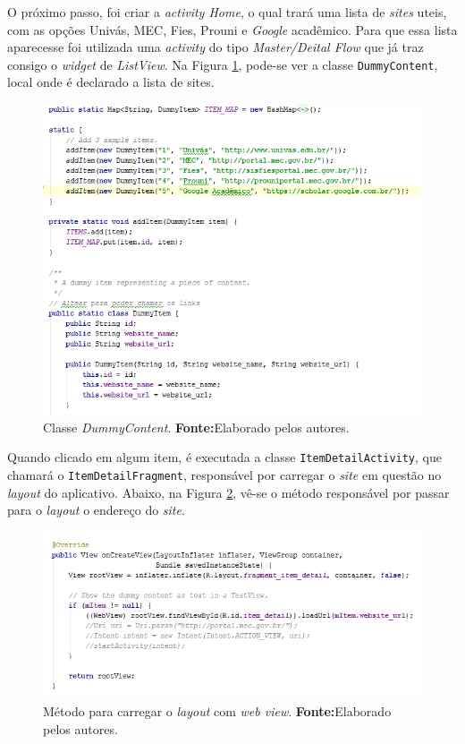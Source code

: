 	\par O próximo passo, foi criar a \textit{activity Home}, o qual trará uma
lista de \textit{sites} uteis, com as opções Univás, MEC, Fies, Prouni e
\textit{Google} acadêmico. Para que essa lista aparecesse foi utilizada uma
\textit{activity} do tipo \textit{Master/Deital Flow} que já traz consigo o
\textit{widget} de \textit{ListView}. Na Figura \ref{fig:qm5}, pode-se ver a
classe \texttt{DummyContent}, local onde é declarado a lista de sites.
	
		
		\begin{figure}[h!]
			\centerline{\includegraphics[scale=0.5]{./imagens/2_q_metodologico/qm5.png}}
			\caption[Classe \textit{DummyContent}]{Classe \textit{DummyContent}.
			 \textbf{Fonte:}Elaborado pelos autores.}
			\label{fig:qm5}
		\end{figure}

	\par Quando clicado em algum item, é executada a classe
\texttt{ItemDetailActivity}, que chamará o \texttt{ItemDetailFragment},
responsável por carregar o \textit{site} em questão no \textit{layout} do
aplicativo. Abaixo, na Figura \ref{fig:qm6}, vê-se o método responsável por
passar para o \textit{layout} o endereço do \textit{site}.
				
		\begin{figure}[h!]
			\centerline{\includegraphics[scale=0.4]{./imagens/2_q_metodologico/qm6.png}}
			\caption[Método para carregar o \textit{layout} com \textit{web
			view}]{Método para carregar o \textit{layout} com \textit{web
			view}.
			 \textbf{Fonte:}Elaborado pelos autores.}
			\label{fig:qm6}
		\end{figure}

